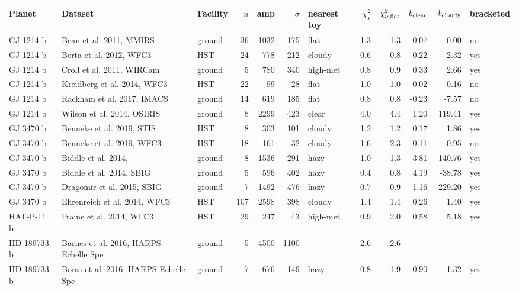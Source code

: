 \begin{table}[H]
\centering\scriptsize
\begin{tabular}{@{}lllrrrlrrrrl@{}}
\toprule
\textbf{Planet} & \textbf{Dataset} & \textbf{Facility} & \textbf{$n$} & \textbf{amp} & \textbf{$\sigma$} & \textbf{nearest toy} & \textbf{$\chi^2_\nu$} & \textbf{$\chi^2_{\nu,\rm flat}$} & \textbf{$b_{\rm clear}$} & \textbf{$b_{\rm cloudy}$} & \textbf{bracketed} \\
\midrule
GJ 1214 b & Bean et al. 2011, MMIRS & ground & 36 & 1032 & 175 & flat & 1.3 & 1.3 & -0.07 & -0.00 & no \\
GJ 1214 b & Berta et al. 2012, WFC3 & HST & 24 & 778 & 212 & cloudy & 0.6 & 0.8 & 0.22 & 2.32 & yes \\
GJ 1214 b & Croll et al. 2011, WIRCam & ground & 5 & 780 & 340 & high-met & 0.8 & 0.9 & 0.33 & 2.66 & yes \\
GJ 1214 b & Kreidberg et al. 2014, WFC3 & HST & 22 & 99 & 28 & flat & 1.0 & 1.0 & 0.02 & 0.16 & no \\
GJ 1214 b & Rackham et al. 2017, IMACS & ground & 14 & 619 & 185 & flat & 0.8 & 0.8 & -0.23 & -7.57 & no \\
GJ 1214 b & Wilson et al. 2014, OSIRIS & ground & 8 & 2299 & 423 & clear & 4.0 & 4.4 & 1.20 & 119.41 & yes \\
GJ 3470 b & Benneke et al. 2019, STIS & HST & 8 & 303 & 101 & cloudy & 1.2 & 1.2 & 0.17 & 1.86 & yes \\
GJ 3470 b & Benneke et al. 2019, WFC3 & HST & 18 & 161 & 32 & cloudy & 1.6 & 2.3 & 0.11 & 0.95 & no \\
GJ 3470 b & Biddle et al. 2014,  & ground & 8 & 1536 & 291 & hazy & 1.0 & 1.3 & 3.81 & -140.76 & yes \\
GJ 3470 b & Biddle et al. 2014, SBIG & ground & 5 & 596 & 402 & hazy & 0.4 & 0.8 & 4.19 & -38.78 & yes \\
GJ 3470 b & Dragomir et al. 2015, SBIG & ground & 7 & 1492 & 476 & hazy & 0.7 & 0.9 & -1.16 & 229.20 & yes \\
GJ 3470 b & Ehrenreich et al. 2014, WFC3 & HST & 107 & 2598 & 398 & cloudy & 1.4 & 1.4 & 0.26 & 1.40 & yes \\
HAT-P-11 b & Fraine et al. 2014, WFC3 & HST & 29 & 247 & 43 & high-met & 0.9 & 2.0 & 0.58 & 5.18 & yes \\
HD 189733 b & Barnes et al. 2016, HARPS Echelle Spe & ground & 5 & 4500 & 1100 & -- & 2.6 & 2.6 & -- & -- & -- \\
HD 189733 b & Borsa et al. 2016, HARPS Echelle Spe & ground & 7 & 676 & 149 & hazy & 0.8 & 1.9 & -0.90 & 1.32 & yes \\

\end{tabular}
\end{table}
